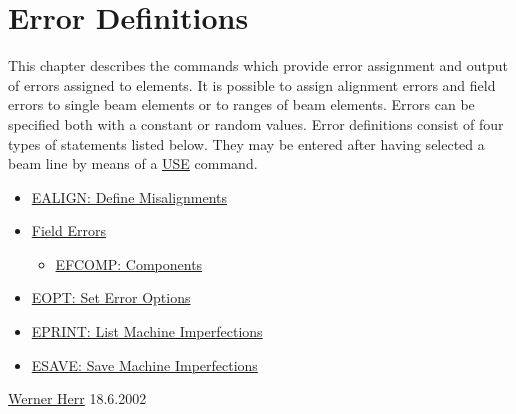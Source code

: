 




\section{Error Definitions}  This chapter describes the commands which provide error assignment and output of errors assigned to elements. It is possible to assign alignment errors and field errors to single beam elements or to ranges of beam elements. Errors can be specified both with a constant or random values. Error definitions consist of four types of statements listed below. They may be entered after having selected a beam line by means of a \href{../control/general.html#use}{USE} command. 
\begin{itemize}
	\item \href{error_align.html}{EALIGN: Define Misalignments}
	\item \href{error_field.html}{Field Errors}
\begin{itemize}
	\item \href{error_field.html#efcomp}{EFCOMP: Components}
\end{itemize}
	\item \href{error_option.html}{EOPT: Set Error Options}
	\item \href{error_print.html}{EPRINT: List Machine Imperfections}
	\item \href{error_save.html}{ESAVE: Save Machine Imperfections}
\end{itemize}\href{http://consult.cern.ch/xwho/people/1808}{Werner Herr} 18.6.2002 

